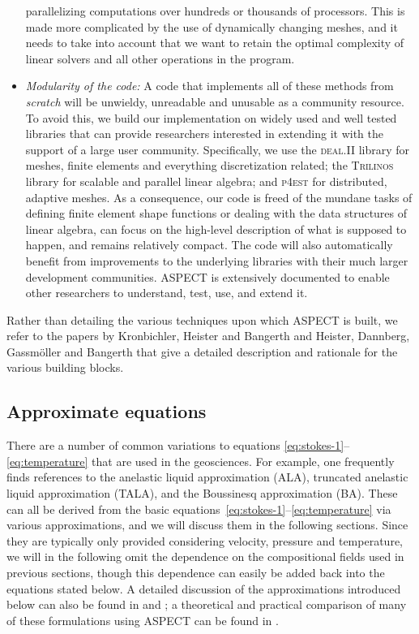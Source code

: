 \documentclass{article}
\newcommand{\dealii}{{\textsc{deal.II}}}
\newcommand{\pfrst}{{\normalfont\textsc{p4est}}}
\newcommand{\trilinos}{{\textsc{Trilinos}}}
\newcommand{\aspect}{\textsc{ASPECT}}
\begin{document}
\begin{itemize}
  parallelizing computations over hundreds or thousands of processors. This is
  made more complicated by the use of dynamically changing meshes, and it
  needs to take into account that we want to retain the optimal complexity of
  linear solvers and all other operations in the program.
\item \textit{Modularity of the code:} A code that implements all of these
  methods from \textit{scratch} will be unwieldy, unreadable and unusable as a community
  resource. To avoid this, we build our implementation on widely used and well
  tested libraries that can provide researchers interested in extending it
  with the support of a large user community. Specifically, we use the
  \dealii{} library \cite{BHK07,BK99m} for meshes, finite
  elements and everything discretization related; the \trilinos{} library
  \cite{trilinos,trilinos-web-page} for scalable and parallel linear algebra;
  and \pfrst{} \cite{p4est} for distributed, adaptive meshes. As a
  consequence, our code is freed of the mundane tasks of defining finite
  element shape functions or dealing with the data structures of linear algebra,
  can focus on the high-level description of what is supposed to happen, and
  remains relatively compact. The code will also
  automatically benefit from improvements to the underlying libraries with
  their much larger development communities. \aspect{} is extensively
  documented to enable other researchers to understand, test, use, and extend it.
\end{itemize}

Rather than detailing the various techniques upon which \aspect{} is built, we
refer to the papers by Kronbichler, Heister and Bangerth \cite{KHB12}
and Heister, Dannberg, Gassm{\"o}ller and Bangerth \cite{heister_aspect_methods2}
that
give a detailed description and rationale for the various building blocks.


\subsection{Approximate equations}
\label{sec:approximate-equations}

There are a number of common variations to equations
\eqref{eq:stokes-1}--\eqref{eq:temperature} that are used in the
geosciences. For example, one frequently finds references to the anelastic liquid
approximation (ALA), truncated anelastic liquid approximation (TALA), and the
Boussinesq approximation (BA). These can all be derived from the basic
equations~\eqref{eq:stokes-1}--\eqref{eq:temperature} via various approximations,
and we will discuss them in the following sections. Since they are typically only provided
considering velocity, pressure and temperature, we will in the following omit
the dependence on the compositional fields used in previous sections, though
this dependence can easily be added back into the equations stated below. A
detailed discussion of the approximations introduced below can also be found in \cite{STO01} and
\cite{KLKLZTTK10}; a theoretical and practical comparison of many of
these formulations using \aspect{} can be found in
\cite{gassmoller2020formulations}.
\end{document}
